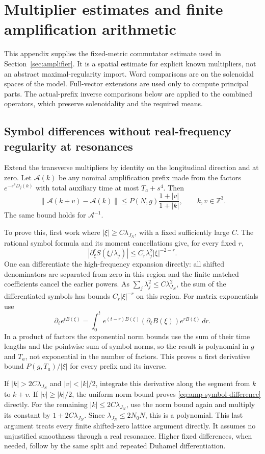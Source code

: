 \documentclass[11pt,a4paper]{amsart}
\theoremstyle{definition}
\theoremstyle{remark}
\numberwithin{equation}{section}
\newcommand{\Z}{\mathbb Z}
\newcommand{\norm}[1]{\lVert #1\rVert}
\begin{document}
\section{Multiplier estimates and finite amplification arithmetic}
\label{app:amplifier}
This appendix supplies the fixed-metric commutator estimate used in
Section~\ref{sec:amplifier}.  It is a spatial estimate for explicit
known multipliers, not an abstract maximal-regularity import.
Word comparisons are on the solenoidal spaces of the model.
Full-vector extensions are used only to compute principal parts.
The actual-prefix inverse comparisons below are applied to the combined
operators, which preserve solenoidality and the required means.

\subsection{Symbol differences without real-frequency regularity at resonances}
Extend the transverse multipliers by identity on the longitudinal
direction and at zero.  Let $\mathcal A(k)$ be any nominal amplification
prefix made from the factors $e^{-s^4D_j(k)}$ with total auxiliary time
at most $T_a+s^4$.  Then
\begin{equation}\label{eq:amp-symbol-difference}
 \norm{\mathcal A(k+v)-\mathcal A(k)}
 \le P(N,g)\frac{1+|v|}{1+|k|},
 \qquad k,v\in\Z^3.
\end{equation}
The same bound holds for $\mathcal A^{-1}$.

To prove this, first work where $|\xi|\ge C\lambda_{J_N}$, with a
fixed sufficiently large $C$.  The rational symbol formula and its
moment cancellations give, for every fixed $r$,
\[
 |\partial_\xi^r S(\xi/\lambda_j)|
       \le C_r\lambda_j^2|\xi|^{-2-r}.
\]
One can differentiate the high-frequency expansion directly: all
shifted denominators are separated from zero in this region and the
finite matched coefficients cancel the earlier powers.
As $\sum_j\lambda_j^2\le C\lambda_{J_N}^2$, the sum of the differentiated
symbols has bounds $C_r|\xi|^{-r}$ on this region.
For matrix exponentials use
\[
 \partial_\ell e^{tB(\xi)}
  =\int_0^t e^{(t-r)B(\xi)}
        (\partial_\ell B(\xi))e^{rB(\xi)}\,dr .
\]
In a product of factors the exponential norm bounds use the sum of
their time lengths and the pointwise sum of symbol norms, so the
result is polynomial in $g$ and $T_a$, not exponential in the number
of factors.  This proves a first derivative bound
$P(g,T_a)/|\xi|$ for every prefix and its inverse.

If $|k|>2C\lambda_{J_N}$ and $|v|<|k|/2$, integrate this derivative
along the segment from $k$ to $k+v$.
If $|v|\ge|k|/2$, the uniform norm bound proves
\eqref{eq:amp-symbol-difference} directly.
For the remaining $|k|\le2C\lambda_{J_N}$, use the norm bound again
and multiply its constant by $1+2C\lambda_{J_N}$.
Since $\lambda_{J_N}\le2N_0N$, this is a polynomial.
This last argument treats every finite shifted-zero lattice argument
directly.  It assumes no unjustified smoothness through a real
resonance.  Higher fixed differences, when needed, follow by the same
split and repeated Duhamel differentiation.
\end{document}
